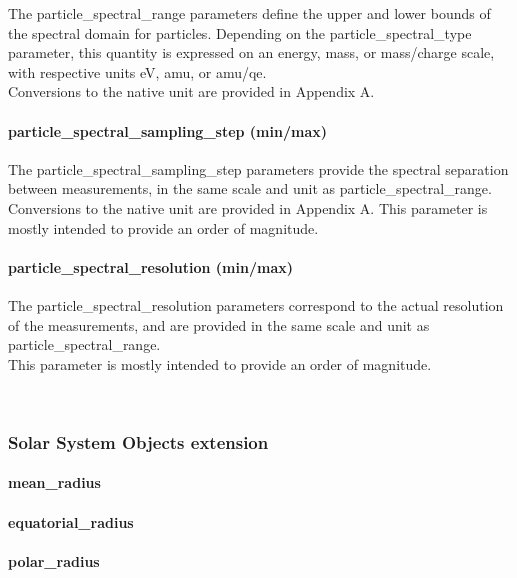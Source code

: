 \documentclass[11pt,a4paper]{ivoa}
\begin{document}
The particle\_spectral\_range parameters define the upper and lower bounds of the spectral domain for particles. Depending on the particle\_spectral\_type parameter, this quantity is expressed on an energy, mass, or mass/charge scale, with respective units eV, amu, or amu/qe. \\ Conversions to the native unit are provided in Appendix A.

\paragraph{particle\_spectral\_sampling\_step (min/max)}

The particle\_spectral\_sampling\_step parameters provide the spectral separation between measurements, in the same scale and unit as particle\_spectral\_range.\\ Conversions to the native unit are provided in Appendix A. This parameter is mostly intended to provide an order of magnitude.

\paragraph{particle\_spectral\_resolution (min/max)}

The particle\_spectral\_resolution parameters correspond to the actual resolution of the measurements, and are provided in the same scale and unit as particle\_spectral\_range. \\ This parameter is mostly intended to provide an order of magnitude.

 

\subsubsection{Solar System Objects extension\\}

\paragraph{mean\_radius}

\paragraph{equatorial\_radius}

\paragraph{polar\_radius}
\end{document}
